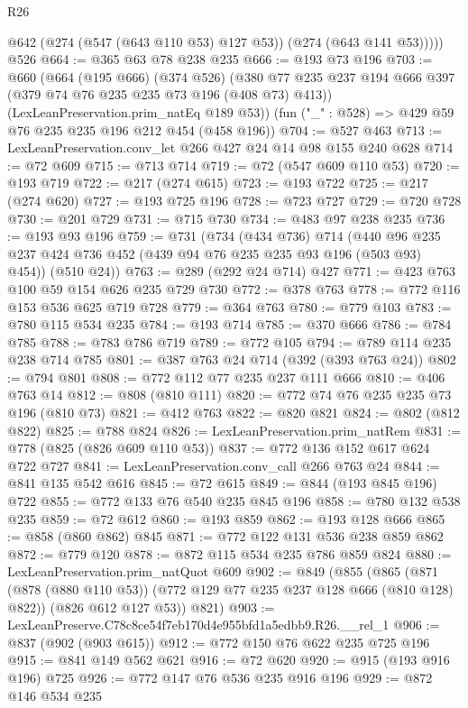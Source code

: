 \begin{lexlean}{R26}
\begin{coremodule}
        @642 (@274 (@547 (@643 @110 @53) @127 @53)) (@274 (@643 @141 @53)))))
    @526
@664 := @365 @63 @78 @238 @235
@666 := @193 @73 @196
@703 := @660
    (@664
      (@195 @666)
      (@374 @526)
      (@380 @77 @235 @237 @194 @666 @397 (@379 @74 @76 @235 @235 @73 @196 (@408 @73) @413))
      (LexLeanPreservation.prim_natEq @189 @53))
    (fun ("_" : @528) => @429 @59 @76 @235 @235 @196 @212 @454 (@458 @196))
@704 := @527 @463
@713 := LexLeanPreservation.conv_let @266 @427 @24 @14 @98 @155 @240 @628
@714 := @72 @609
@715 := @713 @714
@719 := @72 (@547 @609 @110 @53)
@720 := @193 @719
@722 := @217 (@274 @615)
@723 := @193 @722
@725 := @217 (@274 @620)
@727 := @193 @725 @196
@728 := @723 @727
@729 := @720 @728
@730 := @201 @729
@731 := @715 @730
@734 := @483 @97 @238 @235
@736 := @193 @93 @196
@759 := @731
    (@734
      (@434 @736)
      @714
      (@440 @96 @235 @237 @424 @736 @452 (@439 @94 @76 @235 @235 @93 @196 (@503 @93) @454))
      (@510 @24))
@763 := @289 (@292 @24 @714) @427
@771 := @423 @763 @100 @59 @154 @626 @235 @729 @730
@772 := @378 @763
@778 := @772 @116 @153 @536 @625 @719 @728
@779 := @364 @763
@780 := @779 @103
@783 := @780 @115 @534 @235
@784 := @193 @714
@785 := @370 @666
@786 := @784 @785
@788 := @783 @786 @719
@789 := @772 @105
@794 := @789 @114 @235 @238 @714 @785
@801 := @387 @763 @24 @714 (@392 (@393 @763 @24))
@802 := @794 @801
@808 := @772 @112 @77 @235 @237 @111 @666
@810 := @406 @763 @14
@812 := @808 (@810 @111)
@820 := @772 @74 @76 @235 @235 @73 @196 (@810 @73)
@821 := @412 @763
@822 := @820 @821
@824 := @802 (@812 @822)
@825 := @788 @824
@826 := LexLeanPreservation.prim_natRem
@831 := @778 (@825 (@826 @609 @110 @53))
@837 := @772 @136 @152 @617 @624 @722 @727
@841 := LexLeanPreservation.conv_call @266 @763 @24
@844 := @841 @135 @542 @616
@845 := @72 @615
@849 := @844 (@193 @845 @196) @722
@855 := @772 @133 @76 @540 @235 @845 @196
@858 := @780 @132 @538 @235
@859 := @72 @612
@860 := @193 @859
@862 := @193 @128 @666
@865 := @858 (@860 @862) @845
@871 := @772 @122 @131 @536 @238 @859 @862
@872 := @779 @120
@878 := @872 @115 @534 @235 @786 @859 @824
@880 := LexLeanPreservation.prim_natQuot @609
@902 := @849
    (@855
      (@865
        (@871 (@878 (@880 @110 @53)) (@772 @129 @77 @235 @237 @128 @666 (@810 @128) @822))
        (@826 @612 @127 @53))
      @821)
@903 := LexLeanPreserve.C78c8ce54f7eb170d4e955bfd1a5edbb9.R26.__rel_1
@906 := @837 (@902 (@903 @615))
@912 := @772 @150 @76 @622 @235 @725 @196
@915 := @841 @149 @562 @621
@916 := @72 @620
@920 := @915 (@193 @916 @196) @725
@926 := @772 @147 @76 @536 @235 @916 @196
@929 := @872 @146 @534 @235

\end{coremodule}
\end{lexlean}
